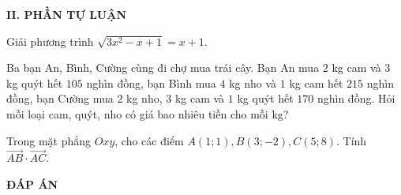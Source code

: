 \noindent\textbf{II. PHẦN TỰ LUẬN}
\begin{bt}%
Giải phương trình $\sqrt{3x^2-x+1}=x+1.$
\end{bt}
\begin{bt}%
Ba bạn An, Bình, Cường cùng đi chợ mua trái cây. Bạn An mua $2$ kg cam và $3$ kg quýt hết $105$ nghìn đồng, bạn Bình mua $4$ kg nho và $1$ kg cam hết $215$ nghìn đồng, bạn Cường mua $2$ kg nho, $3$ kg cam và $1$ kg quýt hết $170$ nghìn đồng. Hỏi mỗi loại cam, quýt, nho có giá bao nhiêu tiền cho mỗi kg?
\end{bt}
\begin{bt}%
Trong mặt phẳng $Oxy$, cho các điểm $A(1;1), B(3;-2), C(5;8)$. Tính $\vec{AB}\cdot\vec{AC}$.
\end{bt}

\newpage
\begin{center}
	\textbf{ĐÁP ÁN}
\end{center}
\begin{multicols}{10}
	
\end{multicols}

